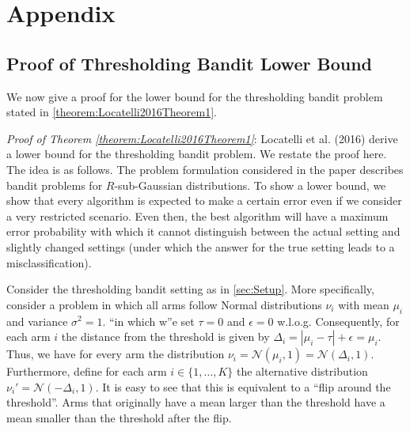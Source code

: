 \documentclass[11pt,]{article}
\begin{document}
\section{Appendix}\label{appendix}

\subsection{\texorpdfstring{Proof of Thresholding Bandit Lower Bound
\label{sec:AppendixAPTLB}}{Proof of Thresholding Bandit Lower Bound }}\label{proof-of-thresholding-bandit-lower-bound}

We now give a proof for the lower bound for the thresholding bandit
problem stated in \autoref{theorem:Locatelli2016Theorem1}.

\emph{Proof of Theorem \ref{theorem:Locatelli2016Theorem1}}: Locatelli
et al. (2016) derive a lower bound for the thresholding bandit problem.
We restate the proof here. The idea is as follows. The problem
formulation considered in the paper describes bandit problems for
\(R\)-sub-Gaussian distributions. To show a lower bound, we show that
every algorithm is expected to make a certain error even if we consider
a very restricted scenario. Even then, the best algorithm will have a
maximum error probability with which it cannot distinguish between the
actual setting and slightly changed settings (under which the answer for
the true setting leads to a misclassification).

Consider the thresholding bandit setting as in \autoref{sec:Setup}. More
specifically, consider a problem in which all arms follow Normal
distributions \(\nu_i\) with mean \(\mu_i\) and variance
\(\sigma^2 = 1\). ``in which w''e set \(\tau = 0\) and \(\epsilon = 0\)
w.l.o.g. Consequently, for each arm \(i\) the distance from the
threshold is given by \(\Delta_i = |\mu_i - \tau| + \epsilon = \mu_i\).
Thus, we have for every arm the distribution
\(\nu_i = \mathcal{N}(\mu_i,1) = \mathcal{N}(\Delta_i,1)\). Furthermore,
define for each arm \(i \in \{1, \dots, K\}\) the alternative
distribution \(\nu_i' = \mathcal{N}(-\Delta_i,1)\). It is easy to see
that this is equivalent to a ``flip around the threshold''. Arms that
originally have a mean larger than the threshold have a mean smaller
than the threshold after the flip.
\end{document}
